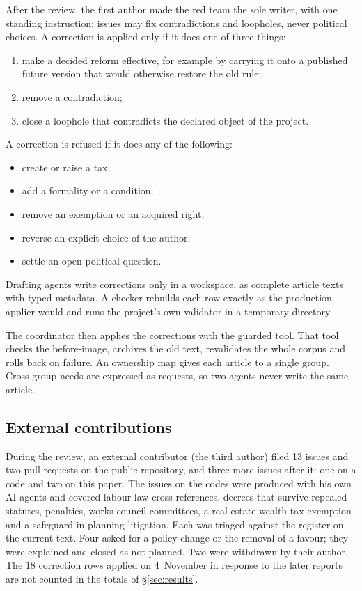 \documentclass[11pt,a4paper]{article}
\begin{document}
After the review, the first author made the red team the sole writer, with one standing instruction: issues may fix contradictions and loopholes, never political choices. A correction is applied only if it does one of three things:
\begin{enumerate}[label=(\alph*)]
  \item make a decided reform effective, for example by carrying it onto a published future version that would otherwise restore the old rule;
  \item remove a contradiction;
  \item close a loophole that contradicts the declared object of the project.
\end{enumerate}
A correction is refused if it does any of the following:
\begin{itemize}
  \item create or raise a tax;
  \item add a formality or a condition;
  \item remove an exemption or an acquired right;
  \item reverse an explicit choice of the author;
  \item settle an open political question.
\end{itemize}

Drafting agents write corrections only in a workspace, as complete article texts with typed metadata. A checker rebuilds each row exactly as the production applier would and runs the project's own validator in a temporary directory.

The coordinator then applies the corrections with the guarded tool. That tool checks the before-image, archives the old text, revalidates the whole corpus and rolls back on failure. An ownership map gives each article to a single group. Cross-group needs are expressed as requests, so two agents never write the same article.

\subsection{External contributions}

During the review, an external contributor (the third author) filed 13 issues and two pull requests on the public repository, and three more issues after it: one on a code and two on this paper. The issues on the codes were produced with his own AI agents and covered labour-law cross-references, decrees that survive repealed statutes, penalties, works-council committees, a real-estate wealth-tax exemption and a safeguard in planning litigation. Each was triaged against the register on the current text. Four asked for a policy change or the removal of a favour; they were explained and closed as not planned. Two were withdrawn by their author. The 18 correction rows applied on 4~November in response to the later reports are not counted in the totals of \S\ref{sec:results}.
\end{document}
